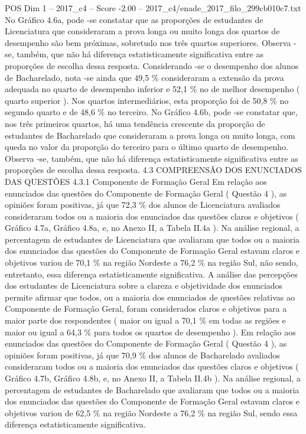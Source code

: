 \begin{textsample}{POS Dim 1 – 2017\_c4 – Score -2.00 – 2017\_c4/enade\_2017\_filo\_299cb010c7.txt}
No Gráfico 4.6a, pode -se constatar que as proporções de estudantes de Licenciatura que consideraram a prova longa ou muito longa dos quartos de desempenho são bem próximas, sobretudo nos três quartos superiores.
Observa -se, também, que não há diferença estatisticamente significativa entre as proporções de escolha dessa resposta.
Considerando -se o desempenho dos alunos de Bacharelado, nota -se ainda que 49,5 \% consideraram a extensão da prova adequada no quarto de desempenho inferior e 52,1 \% no de melhor desempenho ( quarto superior ).
Nos quartos intermediários, esta proporção foi de 50,8 \% no segundo quarto e de 48,6 \% no terceiro.
No Gráfico 4.6b, pode -se constatar que, nos três primeiros quartos, há uma tendência crescente da proporção de estudantes de Bacharelado que consideraram a prova longa ou muito longa, com queda no valor da proporção do terceiro para o último quarto de desempenho.
Observa -se, também, que não há diferença estatisticamente significativa entre as proporções de escolha dessa resposta. 4.3 COMPREENSÃO DOS ENUNCIADOS DAS QUESTÕES 4.3.1 Componente de Formação Geral Em relação aos enunciados das questões do Componente de Formação Geral ( Questão 4 ), as opiniões foram positivas, já que 72,3 \% dos alunos de Licenciatura avaliados consideraram todos ou a maioria dos enunciados das questões claros e objetivos ( Gráfico 4.7a, Gráfico 4.8a, e, no Anexo II, a Tabela II.4a ).
Na análise regional, a percentagem de estudantes de Licenciatura que avaliaram que todos ou a maioria dos enunciados das questões do Componente de Formação Geral estavam claros e objetivos variou de 70,1 \% na região Nordeste a 76,2 \% na região Sul, não sendo, entretanto, essa diferença estatisticamente significativa.
A análise das percepções dos estudantes de Licenciatura sobre a clareza e objetividade dos enunciados permite afirmar que todos, ou a maioria dos enunciados de questões relativas ao Componente de Formação Geral, foram considerados claros e objetivos para a maior parte dos respondentes ( maior ou igual a 70,1 \% em todas as regiões e maior ou igual a 64,3 \% para todos os quartos de desempenho ).
Em relação aos enunciados das questões do Componente de Formação Geral ( Questão 4 ), as opiniões foram positivas, já que 70,9 \% dos alunos de Bacharelado avaliados consideraram todos ou a maioria dos enunciados das questões claros e objetivos ( Gráfico 4.7b, Gráfico 4.8b, e, no Anexo II, a Tabela II.4b ).
Na análise regional, a percentagem de estudantes de Bacharelado que avaliaram que todos ou a maioria dos enunciados das questões do Componente de Formação Geral estavam claros e objetivos variou de 62,5 \% na região Nordeste a 76,2 \% na região Sul, sendo essa diferença estatisticamente significativa.

\end{textsample}
